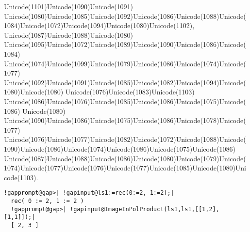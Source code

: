 \documentclass[a4paper,11pt]{report}
\begin{document}
{{{Unicode(1101)Unicode(1090)Unicode(1091)
Unicode(1080)Unicode(1085)Unicode(1092)Unicode(1086)Unicode(1088)Unicode(1084)Unicode(1072)Unicode(1094)Unicode(1080)Unicode(1102),
Unicode(1087)Unicode(1088)Unicode(1080)
Unicode(1095)Unicode(1072)Unicode(1089)Unicode(1090)Unicode(1086)Unicode(1084)
Unicode(1074)Unicode(1099)Unicode(1079)Unicode(1086)Unicode(1074)Unicode(1077)
Unicode(1092)Unicode(1091)Unicode(1085)Unicode(1082)Unicode(1094)Unicode(1080)Unicode(1080)
Unicode(1076)Unicode(1083)Unicode(1103)
Unicode(1086)Unicode(1076)Unicode(1085)Unicode(1086)Unicode(1075)Unicode(1086)
Unicode(1080)
Unicode(1090)Unicode(1086)Unicode(1075)Unicode(1086)Unicode(1078)Unicode(1077)
Unicode(1076)Unicode(1077)Unicode(1082)Unicode(1072)Unicode(1088)Unicode(1090)Unicode(1086)Unicode(1074)Unicode(1086)Unicode(1075)Unicode(1086)
Unicode(1087)Unicode(1088)Unicode(1086)Unicode(1080)Unicode(1079)Unicode(1074)Unicode(1077)Unicode(1076)Unicode(1077)Unicode(1085)Unicode(1080)Unicode(1103). 
\begin{Verbatim}[commandchars=!@|,fontsize=\small,frame=single,label=Пример]
  !gapprompt@gap>| !gapinput@ls1:=rec(0:=2, 1:=2);|
  rec( 0 := 2, 1 := 2 )
  !gapprompt@gap>| !gapinput@ImageInPolProduct(ls1,ls1,[[1,2],[1,1]]);|
  [ 2, 3 ]
  						

\end{Verbatim}}}}
\end{document}
